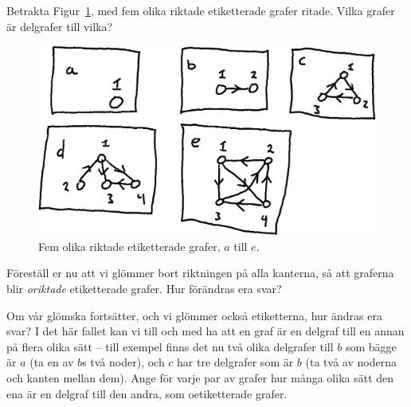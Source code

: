 \documentclass[nobib]{tufte-handout}
\begin{document}
\begin{xca}
    Betrakta Figur~\ref{fig:five_graphs_for_exercise}, med fem olika riktade etiketterade grafer ritade. Vilka grafer är delgrafer till vilka?

    \begin{figure}
        \centering
        \includegraphics[width=\textwidth]{graphics/five_graphs_for_exercise.png}
        \caption{Fem olika riktade etiketterade grafer, $a$ till $e$.}
        \label{fig:five_graphs_for_exercise}
    \end{figure}

    Föreställ er nu att vi glömmer bort riktningen på alla kanterna, så att graferna blir \emph{oriktade} etiketterade grafer. Hur förändras era svar?

    Om vår glömska fortsätter, och vi glömmer också etiketterna, hur ändras era svar? I det här fallet kan vi till och med ha att en graf är en delgraf till en annan på flera olika sätt -- till exempel finns det nu två olika delgrafer till $b$ som bägge är $a$ (ta en av $b$s två noder), och $c$ har tre delgrafer som är $b$ (ta två av noderna och kanten mellan dem). Ange för varje par av grafer hur många olika sätt den ena är en delgraf till den andra, som oetiketterade grafer.
\end{xca}
\end{document}

